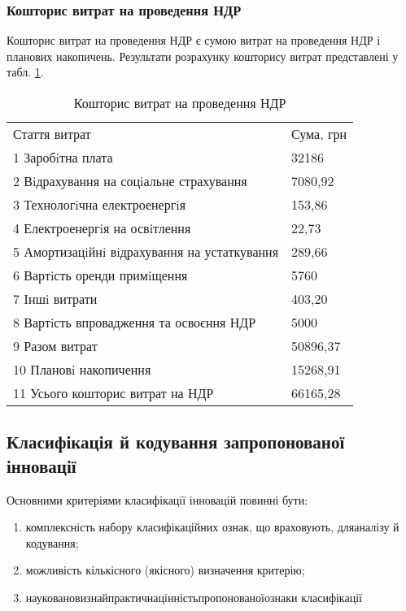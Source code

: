 \vspace{1.5em}

\subsubsection{Кошторис витрат на проведення НДР}

Кошторис витрат на проведення НДР є сумою витрат на проведення НДР і планових накопичень. Результати розрахунку кошторису витрат представлені у табл. \ref{tab:sumNDR}.

\newpage

\begin{table}[hbt]
	\captionstyle{ \raggedright}
	\caption{Кошторис витрат на проведення НДР}\label{tab:sumNDR}
	\begin{tabular}{|p{}|p{}|}
		\hline
		Стаття витрат & Сума, грн \\
		\hlinewd{2pt}
		1 Заробiтна плата & 32186  \\
		\hline
		2 Вiдрахування на соцiальне страхування & 7080,92 \\
		\hline
		3 Технологiчна електроенергiя & 153,86 \\
		\hline
		4 Електроенергiя на освiтлення & 22,73 \\
		\hline
		5 Амортизацiйнi вiдрахування на устаткування & 289,66 \\
		\hline
		6 Вартiсть оренди примiщення & 5760 \\
		\hline
		7 Iншi витрати & 403,20 \\
		\hline
		8 Вартiсть впровадження та освоєння НДР & 5000 \\
		\hline
		9 Разом витрат & 50896,37 \\
		\hline
		10 Плановi накопичення & 15268,91 \\
		\hline
		11 Усього кошторис витрат на НДР & 66165,28  \\
		\hline
	\end{tabular}
\end{table}

\subsection{Класифікація й кодування запропонованої інновації}

Основними критеріями класифікації інновацій повинні бути:

\begin{enumerate}
	\item комплексність набору класифікаційних ознак, що враховують, для\newline \hspace*{-18mm}аналізу й кодування;
	\item можливість кількісного (якісного) визначення критерію;
	\item наукова\hfill новизна\hfill й\hfill практична\hfill цінність\hfill пропонованої\hfill ознаки\newline \hspace*{-20mm} класифікації
\end{enumerate}

